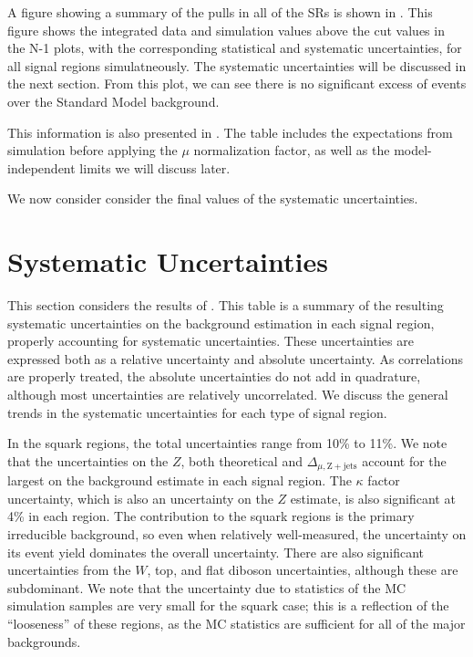 A figure showing a summary of the pulls in all of the SRs is shown in .
This figure shows the integrated data and simulation values above the cut values in the N-1 plots, with the corresponding statistical and systematic uncertainties, for all signal regions simulatneously.
The systematic uncertainties will be discussed in the next section.
From this plot, we can see there is no significant excess of events over the Standard Model background.

This information is also presented in .
The table includes the expectations from simulation before applying the $\mu$ normalization factor, as well as the model-independent limits we will discuss later.

We now consider consider the final values of the systematic uncertainties.

\section{Systematic Uncertainties}

This section considers the results of .
This table is a summary of the resulting systematic uncertainties on the background estimation in each signal region, properly accounting for systematic uncertainties.
These uncertainties are expressed both as a relative uncertainty and absolute uncertainty.
As correlations are properly treated, the absolute uncertainties do not add in quadrature, although most uncertainties are relatively uncorrelated.
We discuss the general trends in the systematic uncertainties for each type of signal region.

In the squark regions, the total uncertainties range from 10\% to 11\%.
We note that the uncertainties on the $Z$, both theoretical and $\Delta_{\mu,\mathrm{Z+jets}}$ account for the largest on the background estimate in each signal region.
The $\kappa$ factor uncertainty, which is also an uncertainty on the $Z$ estimate, is also significant at 4\% in each region.
The \Zvv contribution to the squark regions is the primary irreducible background, so even when relatively well-measured, the uncertainty on its event yield dominates the overall uncertainty.
There are also significant uncertainties from the $W$, top, and flat diboson uncertainties, although these are subdominant.
We note that the uncertainty due to statistics of the MC simulation samples are very small for the squark case; this is a reflection of the ``looseness'' of these regions, as the MC statistics are sufficient for all of the major backgrounds.

